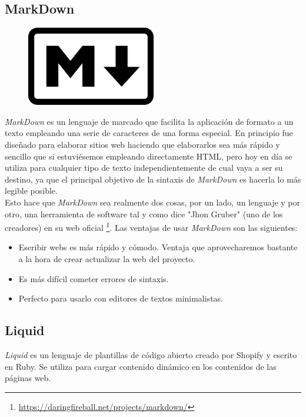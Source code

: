 \subsection{MarkDown}
\label{subsec:markdo}
\begin{figure}[h]
    \centering
    \includegraphics[scale=0.6]{img/logo_markdown.png}
    \label{fig:logoMd}
\end{figure}
\emph{MarkDown} es un lenguaje de marcado que facilita la aplicación de formato a un texto empleando una serie de caracteres de una forma especial. En principio fue diseñado para elaborar sitios web haciendo que elaborarlos sea más rápido y sencillo que si estuviésemos empleando directamente HTML, pero hoy en día se utiliza para cualquier tipo de texto independientemente de cual vaya a ser su destino, ya que el principal objetivo de la sintaxis de \emph{MarkDown} es hacerla lo más legible posible. \\
Esto hace que \emph{MarkDown} sea realmente dos cosas, por un lado, un lenguaje y por otro, una herramienta de software tal y como dice "Jhon Gruber" (uno de los creadores) en su web oficial \footnote{\url{https://daringfireball.net/projects/markdown/}}.
Las ventajas de usar \emph{MarkDown} son las siguientes:
\begin{itemize}
    \item Escribir webs es más rápido y cómodo. Ventaja que aprovecharemos bastante a la hora de crear actualizar la web del proyecto.
    \item Es más difícil cometer errores de sintaxis.
    \item Perfecto para usarlo con editores de textos minimalistas.
\end{itemize}

\subsection{Liquid}
\label{subse:liquid}
\emph{Liquid} es un lenguaje de plantillas de código abierto creado por Shopify y escrito en Ruby. Se utiliza para cargar contenido dinámico en los contenidos de las páginas web.

